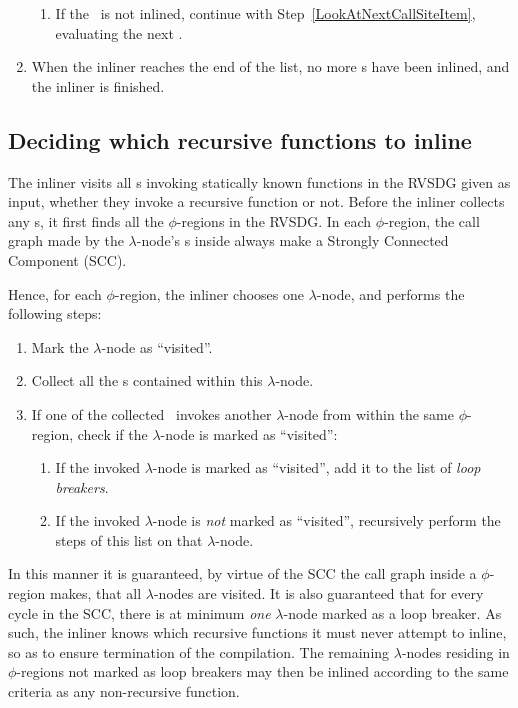 \begin{enumerate}
\begin{enumerate}
		\item If the \applyNode~is not inlined, continue with
Step~\ref{LookAtNextCallSiteItem}, evaluating the next \applyNode .
		\label{InlineCallSiteItem}
	\end{enumerate}

	\item When the inliner reaches the end of the list, no more \applyNode s
have been inlined, and the inliner is finished.
\end{enumerate}

\subsection{Deciding which recursive functions to inline}
\label{sub:scheme:inlining_recur_apply_nodes}

The inliner visits all \applyNode s invoking statically known functions in the
RVSDG given as input, whether they invoke a recursive function or not. Before
the inliner collects any \applyNode s, it first finds all the $\phi$-regions in
the RVSDG. In each $\phi$-region, the call graph made by the $\lambda$-node's
\applyNode s inside always make a Strongly Connected Component (SCC).

Hence, for each $\phi$-region, the inliner chooses one $\lambda$-node, and
performs the following steps:

\begin{enumerate}
	\item Mark the $\lambda$-node as ``visited''.

	\item Collect all the \applyNode s contained within this $\lambda$-node.

	\item If one of the collected \applyNode~invokes another $\lambda$-node from
within the same $\phi$-region, check if the $\lambda$-node is marked as
``visited'':
	\begin{enumerate}
		\item If the invoked $\lambda$-node is marked as ``visited'', add it to
the list of \textit{loop breakers}.

		\item If the invoked $\lambda$-node is \textit{not} marked as
``visited'', recursively perform the steps of this list on that $\lambda$-node.
	\end{enumerate}
\end{enumerate}

In this manner it is guaranteed, by virtue of the SCC the call graph inside a
$\phi$-region makes, that all $\lambda$-nodes are visited. It is also guaranteed
that for every cycle in the SCC, there is at minimum \textit{one} $\lambda$-node
marked as a loop breaker. As such, the inliner knows which recursive functions
it must never attempt to inline, so as to ensure termination of the compilation.
The remaining $\lambda$-nodes residing in $\phi$-regions not marked as loop
breakers may then be inlined according to the same criteria as any non-recursive
function.


